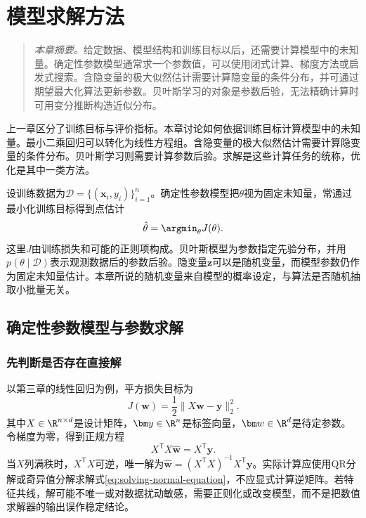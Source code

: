 \chapter{模型求解方法}
\label{chap:model-solving}

\begin{quote}\small
\textit{本章摘要。}给定数据、模型结构和训练目标以后，还需要计算模型中的未知量。确定性参数模型通常求一个参数值，可以使用闭式计算、梯度方法或启发式搜索。含隐变量的极大似然估计需要计算隐变量的条件分布，并可通过期望最大化算法更新参数。贝叶斯学习的对象是参数后验，无法精确计算时可用变分推断构造近似分布。
\end{quote}

上一章区分了训练目标与评价指标。本章讨论如何依据训练目标计算模型中的未知量。最小二乘回归可以转化为线性方程组。含隐变量的极大似然估计需要计算隐变量的条件分布。贝叶斯学习则需要计算参数后验。求解是这些计算任务的统称，优化是其中一类方法。

设训练数据为$\mathcal D=\{(\bm x_i,y_i)\}_{i=1}^n$。确定性参数模型把$\theta$视为固定未知量，常通过最小化训练目标得到点估计
\begin{equation}
 \hat\theta=\argmin_\theta J(\theta).
 \label{eq:solving-deterministic-objective}
\end{equation}
这里$J$由训练损失和可能的正则项构成。贝叶斯模型为参数指定先验分布，并用$p(\theta\mid\mathcal D)$表示观测数据后的参数后验。隐变量$\bm z$可以是随机变量，而模型参数仍作为固定未知量估计。本章所说的随机变量来自模型的概率设定，与算法是否随机抽取小批量无关。

\section{确定性参数模型与参数求解}

\subsection{先判断是否存在直接解}
以第三章的线性回归为例，平方损失目标为
\begin{equation}
 J(\bm w)=\frac12\|X\bm w-\bm y\|_2^2.
 \label{eq:solving-least-squares}
\end{equation}
其中$X\in\R^{n\times d}$是设计矩阵，$\bm y\in\R^n$是标签向量，$\bm w\in\R^d$是待定参数。令梯度为零，得到正规方程
\begin{equation}
 X^{\mathsf T}X\hat{\bm w}=X^{\mathsf T}\bm y.
 \label{eq:solving-normal-equation}
\end{equation}
当$X$列满秩时，$X^{\mathsf T}X$可逆，唯一解为$\hat{\bm w}=(X^{\mathsf T}X)^{-1}X^{\mathsf T}\bm y$。实际计算应使用QR分解或奇异值分解求解式\eqref{eq:solving-normal-equation}，不应显式计算逆矩阵。若特征共线，解可能不唯一或对数据扰动敏感，需要正则化或改变模型，而不是把数值求解器的输出误作稳定结论。

